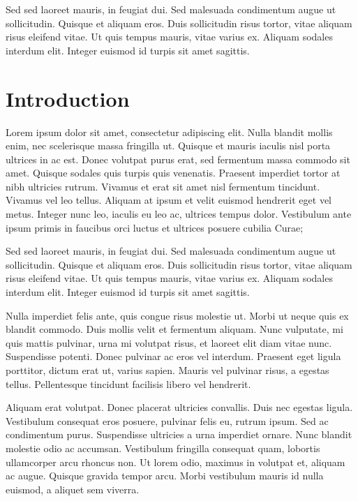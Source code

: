 \documentclass{article}[12pt,a4paper]
\begin{document}
Sed sed laoreet mauris, in feugiat dui. 
Sed malesuada condimentum augue ut sollicitudin. 
Quisque et aliquam eros. 
Duis sollicitudin risus tortor, vitae aliquam risus eleifend vitae. 
Ut quis tempus mauris, vitae varius ex. 
Aliquam sodales interdum elit. 
Integer euismod id turpis sit amet sagittis.


\newpage
\tableofcontents
\thispagestyle{empty}
\newpage
{}

\section{Introduction}

Lorem ipsum dolor sit amet, consectetur adipiscing elit. \cite{adi}
Nulla blandit mollis enim, nec scelerisque massa fringilla ut. 
Quisque et mauris iaculis nisl porta ultrices in ac est. 
Donec volutpat purus erat, sed fermentum massa commodo sit amet. 
Quisque sodales quis turpis quis venenatis. 
Praesent imperdiet tortor at nibh ultricies rutrum. 
Vivamus et erat sit amet nisl fermentum tincidunt. 
Vivamus vel leo tellus. 
Aliquam at ipsum et velit euismod hendrerit eget vel metus. 
Integer nunc leo, iaculis eu leo ac, ultrices tempus dolor. 
Vestibulum ante ipsum primis in faucibus orci luctus et ultrices posuere 
cubilia Curae;

Sed sed laoreet mauris, in feugiat dui. 
Sed malesuada condimentum augue ut sollicitudin. 
Quisque et aliquam eros. 
Duis sollicitudin risus tortor, vitae aliquam risus eleifend vitae. 
Ut quis tempus mauris, vitae varius ex. 
Aliquam sodales interdum elit. 
Integer euismod id turpis sit amet sagittis.

Nulla imperdiet felis ante, quis congue risus molestie ut. 
Morbi ut neque quis ex blandit commodo. 
Duis mollis velit et fermentum aliquam. 
Nunc vulputate, mi quis mattis pulvinar, urna mi volutpat risus, 
et laoreet elit diam vitae nunc. Suspendisse potenti. 
Donec pulvinar ac eros vel interdum. 
Praesent eget ligula porttitor, dictum erat ut, varius sapien. 
Mauris vel pulvinar risus, a egestas tellus. 
Pellentesque tincidunt facilisis libero vel hendrerit.

Aliquam erat volutpat. 
Donec placerat ultricies convallis. 
Duis nec egestas ligula. 
Vestibulum consequat eros posuere, pulvinar felis eu, rutrum ipsum. 
Sed ac condimentum purus. 
Suspendisse ultricies a urna imperdiet ornare. 
Nunc blandit molestie odio ac accumsan. 
Vestibulum fringilla consequat quam, lobortis ullamcorper arcu rhoncus non. 
Ut lorem odio, maximus in volutpat et, aliquam ac augue. 
Quisque gravida tempor arcu. 
Morbi vestibulum mauris id nulla euismod, a aliquet sem viverra.
\end{document}
